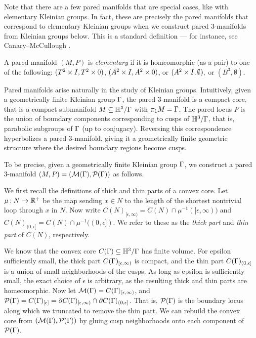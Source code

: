Note that there are a few pared manifolds that are special cases, like with
elementary Kleinian groups. In fact, these are precisely the pared manifolds
that correspond to elementary Kleinian groups when we construct pared
$3$-manifolds from Kleinian groups below. This is a standard definition --- for
instance, see Canary--McCullough \cite[pp88]{CMc}.

\begin{defn}

A pared manifold $(M,P)$ is \emph{elementary} if it is homeomorphic (as a pair)
to one of the following: $(T^2\times I,T^2\times 0)$, $(A^2\times I,A^2\times 0)$, or $(A^2\times
I,\emptyset)$, or $(B^3,\emptyset)$.

\end{defn}

Pared manifolds arise naturally in the study of Kleinian groups. Intuitively,
given a geometrically finite Kleinian group $\Gamma$, the pared $3$-manifold is
a compact core, that is a compact submanifold $M \subseteq \mathbb{H}^3/\Gamma$ with $\pi_1M
= \Gamma$.  The pared locus $P$ is the union of boundary components corresponding
to cusps of $\mathbb{H}^3/\Gamma$, that is, parabolic subgroups of $\Gamma$ (up to
conjugacy).  Reversing this correspondence hyperbolizes a pared $3$-manifold,
giving it a geometrically finite geometric structure where the desired boundary
regions become cusps.

To be precise, given a geometrically finite Kleinian group $\Gamma$, we construct
a pared $3$-manifold $(M,P)=(\mathcal{M}(\Gamma),\mathcal{P}(\Gamma))$ as follows.

We first recall the definitions of thick and thin parts of a convex core. Let
$\mu \colon N \to \mathbb{R}^+$ be the map sending $x\in N$ to the length of the
shortest nontrivial loop through $x$ in $N$. Now write
$C(N)_{[\epsilon,\infty)} = C(N) \cap \mu^{-1}([\epsilon,\infty))$ and
$C(N)_{(0,\epsilon]} = C(N) \cap \mu^{-1}((0,\epsilon])$. We refer to these as
the \emph{thick part} and \emph{thin part} of $C(N)$, respectively.

We know that the convex core $C(\Gamma) \subseteq \mathbb{H}^3/\Gamma$ has finite volume. For
epsilon sufficiently small, the thick part $C(\Gamma)_{[\epsilon,\infty)}$ is
compact, and the thin part $C(\Gamma)_{(0,\epsilon]}$ is a union of small
neighborhoods of the cusps.  As long as epsilon is sufficiently small, the
exact choice of $\epsilon$ is arbitrary, as the resulting thick and thin parts
are homeomorphic.  Now let $\mathcal{M}(\Gamma) = C(\Gamma)_{[\epsilon,\infty)}$, and
$\mathcal{P}(\Gamma) = C(\Gamma)_{[\epsilon]} = \partial C(\Gamma)_{[\epsilon,\infty)} \cap \partial
C(\Gamma)_{(0,\epsilon]}$.  That is, $\mathcal{P}(\Gamma)$ is the boundary locus along which
we truncated to remove the thin part. We can rebuild the convex core from
$(\mathcal{M}(\Gamma),\mathcal{P}(\Gamma))$ by gluing cusp neighborhoods onto each component of
$\mathcal{P}(\Gamma)$.

